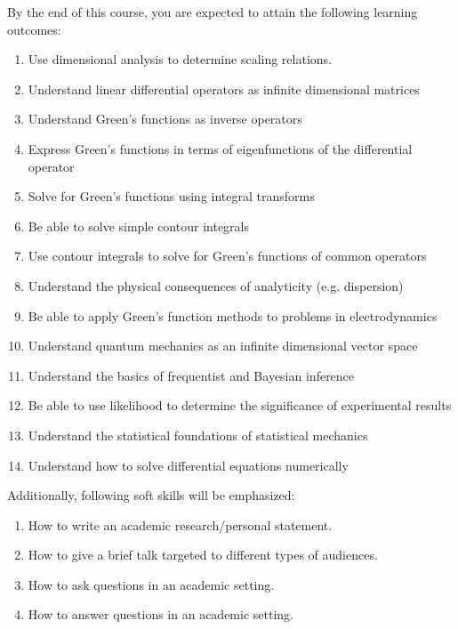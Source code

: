\documentclass[12pt]{article}
\numberwithin{equation}{section}    %
\begin{document}
By the end of this course, you are expected to attain the following learning outcomes:
\begin{enumerate}
	\item Use dimensional analysis to determine scaling relations.
	\item Understand linear differential operators as infinite dimensional matrices
	\item Understand Green's functions as inverse operators
	\item Express Green's functions in terms of eigenfunctions of the differential operator
	\item Solve for Green's functions using integral transforms
	\item Be able to solve simple contour integrals
	\item Use contour integrals to solve for Green's functions of common operators
	\item Understand the physical consequences of analyticity (e.g. dispersion)
	\item Be able to apply Green's function methods to problems in electrodynamics
	\item Understand quantum mechanics as an infinite dimensional vector space
	\item Understand the basics of frequentist and Bayesian inference
	\item Be able to use likelihood to determine the significance of experimental results
	\item Understand the statistical foundations of statistical mechanics
	\item Understand how to solve differential equations numerically
\end{enumerate}
Additionally, following soft skills will be emphasized:
\begin{enumerate}
	\item How to write an academic research/personal statement.
	\item How to give a brief talk targeted to different types of audiences.
	\item How to ask questions in an academic setting.
	\item How to answer questions in an academic setting. 
\end{enumerate}
\end{document}
